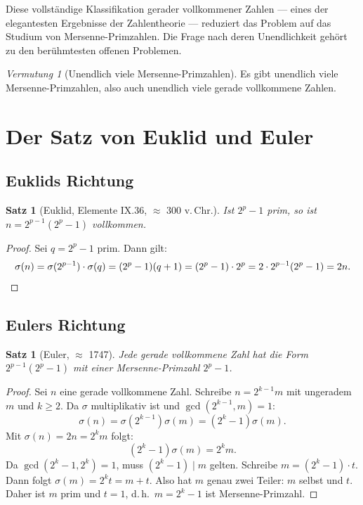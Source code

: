 \documentclass[12pt,a4paper]{amsart}
\newtheorem{satz}[theorem]{Satz}
\theoremstyle{definition}
\theoremstyle{remark}
\newtheorem{vermutung}[theorem]{Vermutung}
\begin{document}
Diese vollständige Klassifikation gerader vollkommener Zahlen --- eines der
elegantesten Ergebnisse der Zahlentheorie --- reduziert das Problem auf das
Studium von Mersenne-Primzahlen.
Die Frage nach deren Unendlichkeit gehört zu den berühmtesten offenen Problemen.

\begin{vermutung}[Unendlich viele Mersenne-Primzahlen]
\label{verm:unendlich}
Es gibt unendlich viele Mersenne-Primzahlen, also auch unendlich viele
gerade vollkommene Zahlen.
\end{vermutung}

\section{Der Satz von Euklid und Euler}

\subsection{Euklids Richtung}

\begin{satz}[Euklid, Elemente IX.36, $\approx$ 300 v.\,Chr.]
Ist $2^p - 1$ prim, so ist $n = 2^{p-1}(2^p - 1)$ vollkommen.
\end{satz}

\begin{proof}
Sei $q = 2^p - 1$ prim. Dann gilt:
\[
  \sigma(n) = \sigma(2^{p-1}) \cdot \sigma(q)
  = (2^p - 1)(q + 1)
  = (2^p - 1) \cdot 2^p
  = 2 \cdot 2^{p-1}(2^p - 1) = 2n. \qedhere
\]
\end{proof}

\subsection{Eulers Richtung}

\begin{satz}[Euler, $\approx$ 1747]
Jede gerade vollkommene Zahl hat die Form $2^{p-1}(2^p - 1)$
mit einer Mersenne-Primzahl $2^p - 1$.
\end{satz}

\begin{proof}
Sei $n$ eine gerade vollkommene Zahl. Schreibe $n = 2^{k-1} m$ mit ungeradem
$m$ und $k \geq 2$.
Da $\sigma$ multiplikativ ist und $\gcd(2^{k-1}, m) = 1$:
\[
  \sigma(n) = \sigma(2^{k-1})\sigma(m) = (2^k - 1)\sigma(m).
\]
Mit $\sigma(n) = 2n = 2^k m$ folgt:
\[
  (2^k - 1)\sigma(m) = 2^k m.
\]
Da $\gcd(2^k - 1, 2^k) = 1$, muss $(2^k - 1) \mid m$ gelten.
Schreibe $m = (2^k - 1) \cdot t$. Dann folgt $\sigma(m) = 2^k t = m + t$.
Also hat $m$ genau zwei Teiler: $m$ selbst und $t$.
Daher ist $m$ prim und $t = 1$, d.\,h.\ $m = 2^k - 1$ ist Mersenne-Primzahl.
\end{proof}
\end{document}
